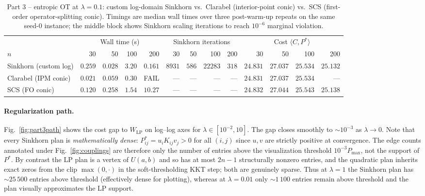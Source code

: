 \documentclass{article}
\begin{document}
\begin{table}[h]
\centering
\caption{Part 3 -- entropic OT at $\lambda\!=\!0.1$: custom log-domain
Sinkhorn vs.\ Clarabel (interior-point conic) vs.\ SCS (first-order
operator-splitting conic).  Timings are median wall times over three
post-warm-up repeats on the same seed-0 instance; the middle block
shows Sinkhorn scaling iterations to reach $10^{-6}$ marginal violation.}
\label{tab:part3}
\scriptsize
\setlength{\tabcolsep}{2pt}
\begin{tabular}{l rrrr rrrr rrrr}
\toprule
& \multicolumn{4}{c}{Wall time (s)}
& \multicolumn{4}{c}{Sinkhorn iterations}
& \multicolumn{4}{c}{Cost $\langle C,P^*\rangle$} \\
\cmidrule(lr){2-5}\cmidrule(lr){6-9}\cmidrule(lr){10-13}
$n$           & 30 & 50 & 100 & 200 & 30 & 50 & 100 & 200 & 30 & 50 & 100 & 200 \\
\midrule
Sinkhorn (custom log)
  & $0.259$ & $0.028$ & $3.20$ & $0.161$
  & $8931$ & $586$ & $22283$ & $318$
  & $24.831$ & $27.037$ & $25.534$ & $25.132$ \\
Clarabel (IPM conic)
  & $0.021$ & $0.059$ & $0.30$ & FAIL
  & --- & --- & --- & ---
  & $24.831$ & $27.037$ & $25.534$ & --- \\
SCS (FO conic)
  & $0.120$ & $0.258$ & $1.54$ & $10.27$
  & --- & --- & --- & ---
  & $24.832$ & $27.044$ & $25.543$ & $25.138$ \\
\bottomrule
\end{tabular}
\end{table}

\paragraph{Regularization path.}
Fig.~\ref{fig:part3path} shows the cost gap to $W_{\mathrm{LP}}$ on
log--log axes for $\lambda\!\in\![10^{-2},10]$.  The gap closes smoothly
to $\sim\!10^{-3}$ as $\lambda\!\to\!0$.  Note that every Sinkhorn plan
is \emph{mathematically dense}: $P^*_{ij}\!=\!u_iK_{ij}v_j\!>\!0$ for
all $(i,j)$ since $u, v$ are strictly positive at convergence.
The edge counts annotated under Fig.~\ref{fig:couplings} are therefore
only the number of entries above the visualization threshold
$10^{-3}P_{\max}$, not the support of $P^*$.  By contrast the LP plan
is a vertex of $U(a,b)$ and so has at most $2n\!-\!1$ structurally
nonzero entries, and the quadratic plan inherits exact zeros from the
clip $\max(0,\cdot)$ in the soft-thresholding KKT step; both are
genuinely sparse.  Thus at $\lambda\!=\!1$ the Sinkhorn plan has
$\sim\!25\,500$ entries above threshold (effectively dense for plotting),
whereas at $\lambda\!=\!0.01$ only $\sim\!1\,100$ entries remain above
threshold and the plan visually approximates the LP support.
\end{document}
